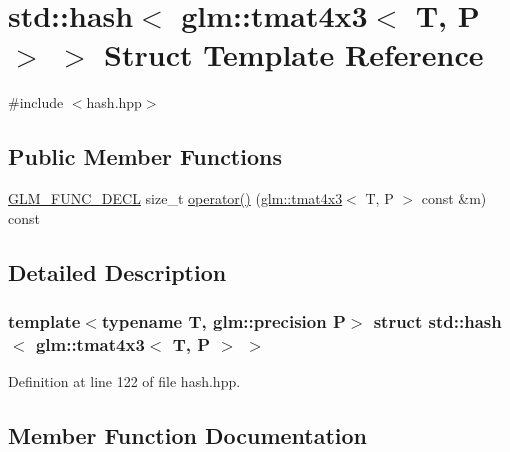 \hypertarget{structstd_1_1hash_3_01glm_1_1tmat4x3_3_01_t_00_01_p_01_4_01_4}{}\section{std\+::hash$<$ glm\+::tmat4x3$<$ T, P $>$ $>$ Struct Template Reference}
\label{structstd_1_1hash_3_01glm_1_1tmat4x3_3_01_t_00_01_p_01_4_01_4}


{\ttfamily \#include $<$hash.\+hpp$>$}

\subsection*{Public Member Functions}
\begin{DoxyCompactItemize}
\item 
\mbox{\hyperlink{setup_8hpp_ab2d052de21a70539923e9bcbf6e83a51}{G\+L\+M\+\_\+\+F\+U\+N\+C\+\_\+\+D\+E\+CL}} size\+\_\+t \mbox{\hyperlink{structstd_1_1hash_3_01glm_1_1tmat4x3_3_01_t_00_01_p_01_4_01_4_a45b26e988d064c3a639d7f502065f54c}{operator()}} (\mbox{\hyperlink{structglm_1_1tmat4x3}{glm\+::tmat4x3}}$<$ T, P $>$ const \&m) const
\end{DoxyCompactItemize}


\subsection{Detailed Description}
\subsubsection*{template$<$typename T, glm\+::precision P$>$\newline
struct std\+::hash$<$ glm\+::tmat4x3$<$ T, P $>$ $>$}



Definition at line 122 of file hash.\+hpp.



\subsection{Member Function Documentation}
\mbox{\label{structstd_1_1hash_3_01glm_1_1tmat4x3_3_01_t_00_01_p_01_4_01_4_a45b26e988d064c3a639d7f502065f54c}} 
